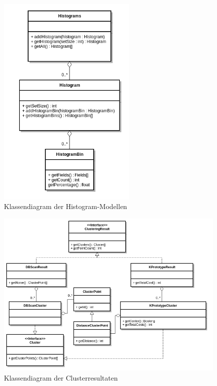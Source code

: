 \begin{figure}[H]
	\centering
	\includegraphics[width=0.6\textwidth]{images/diagram-class-Histograms}
	\caption{Klassendiagram der Histogram-Modellen}
	\label{fig:proofofconcept:klassenstruktur:6}
\end{figure}
\begin{figure}
	\centering
	\includegraphics[width=1\textwidth]{images/diagram-class-clusters}
	\caption{Klassendiagram der Clusterresultaten}
	\label{fig:proofofconcept:klassenstruktur:7}
\end{figure}

